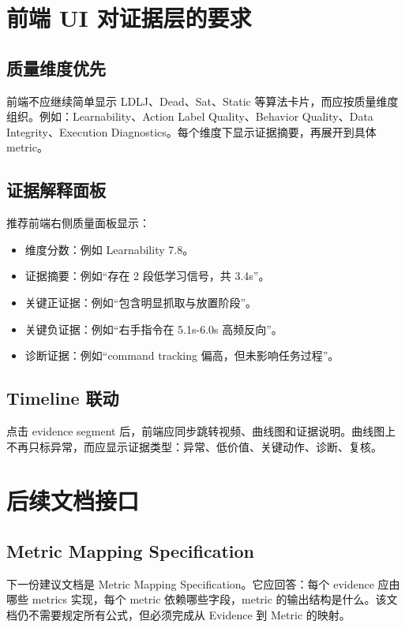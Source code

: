 \documentclass[UTF8,zihao=-4,oneside,openany]{ctexrep}
\begin{document}
\section{前端 UI 对证据层的要求}

\subsection{质量维度优先}

前端不应继续简单显示 LDLJ、Dead、Sat、Static 等算法卡片，而应按质量维度组织。例如：Learnability、Action Label Quality、Behavior Quality、Data Integrity、Execution Diagnostics。每个维度下显示证据摘要，再展开到具体 metric。

\subsection{证据解释面板}

推荐前端右侧质量面板显示：

\begin{itemize}
  \item 维度分数：例如 Learnability 7.8。
  \item 证据摘要：例如“存在 2 段低学习信号，共 3.4s”。
  \item 关键正证据：例如“包含明显抓取与放置阶段”。
  \item 关键负证据：例如“右手指令在 5.1s-6.0s 高频反向”。
  \item 诊断证据：例如“command tracking 偏高，但未影响任务过程”。
\end{itemize}

\subsection{Timeline 联动}

点击 evidence segment 后，前端应同步跳转视频、曲线图和证据说明。曲线图上不再只标异常，而应显示证据类型：异常、低价值、关键动作、诊断、复核。

\section{后续文档接口}

\subsection{Metric Mapping Specification}

下一份建议文档是 Metric Mapping Specification。它应回答：每个 evidence 应由哪些 metrics 实现，每个 metric 依赖哪些字段，metric 的输出结构是什么。该文档仍不需要规定所有公式，但必须完成从 Evidence 到 Metric 的映射。
\end{document}
